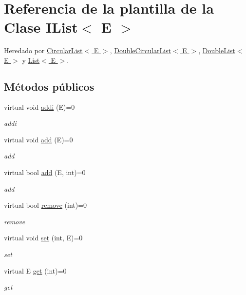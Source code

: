 \hypertarget{classIList}{\section{Referencia de la plantilla de la Clase I\-List$<$ E $>$}
\label{classIList}
}


Heredado por \hyperlink{classCircularList}{Circular\-List$<$ E $>$}, \hyperlink{classDoubleCircularList}{Double\-Circular\-List$<$ E $>$}, \hyperlink{classDoubleList}{Double\-List$<$ E $>$} y \hyperlink{classList}{List$<$ E $>$}.

\subsection*{Métodos públicos}
\begin{DoxyCompactItemize}
\item 
virtual void \hyperlink{classIList_af202dc9e748ee32238d80e57dfbcae20}{addi} (E)=0
\begin{DoxyCompactList}\small\item\em addi \end{DoxyCompactList}\item 
virtual void \hyperlink{classIList_a27500caa3d9da05aa6437d5ff56b09e2}{add} (E)=0
\begin{DoxyCompactList}\small\item\em add \end{DoxyCompactList}\item 
virtual bool \hyperlink{classIList_a70140dbc9de2b9f6e5ffd2212d5ea8b0}{add} (E, int)=0
\begin{DoxyCompactList}\small\item\em add \end{DoxyCompactList}\item 
virtual bool \hyperlink{classIList_a9bf7d737252dfbd4c9a5d7be36ea4231}{remove} (int)=0
\begin{DoxyCompactList}\small\item\em remove \end{DoxyCompactList}\item 
virtual void \hyperlink{classIList_a119ed658d2804aec0b9fef9325c03073}{set} (int, E)=0
\begin{DoxyCompactList}\small\item\em set \end{DoxyCompactList}\item 
virtual E \hyperlink{classIList_a60570f7ee0e7474d01b2f364bad996a0}{get} (int)=0
\begin{DoxyCompactList}\small\item\em get \end{DoxyCompactList}\item 

\end{DoxyCompactItemize}
